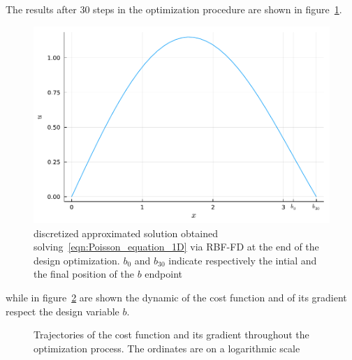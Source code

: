 \smallskip
The results after $30$ steps in the optimization procedure are shown in figure~\ref{fig:opt_results_1D}.

\begin{figure}
	\centering
	\includegraphics[width=.75\textwidth]{img/uOpt_vs_x_1D.pdf}
	\caption{discretized approximated solution obtained solving~\eqref{eqn:Poisson_equation_1D} via RBF-FD at the end of the design optimization. $b_0$ and $b_{30}$ indicate respectively the intial and the final position of the $b$ endpoint}
	\label{fig:opt_results_1D}
\end{figure}

while in figure~\ref{fig:opt_history_1D} are shown the dynamic of the cost function and of its gradient respect the design variable $b$.

\begin{figure}
	\centering
	 \quad
	\caption{Trajectories of the cost function and its gradient throughout the optimization process. The ordinates are on a logarithmic scale}
	\label{fig:opt_history_1D}
\end{figure}



